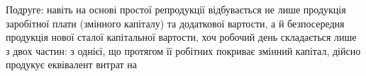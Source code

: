 Подруге: навіть на основі простої репродукції відбувається не лише
продукція заробітної плати (змінного капіталу) та додаткової вартости,
а й безпосередня продукція нової сталої капітальної вартости, хоч робочий
день складається лише з двох частин: з однієї, що протягом її
робітних покриває змінний капітал, дійсно продукує еквівалент витрат на
\parbreak{}  %
